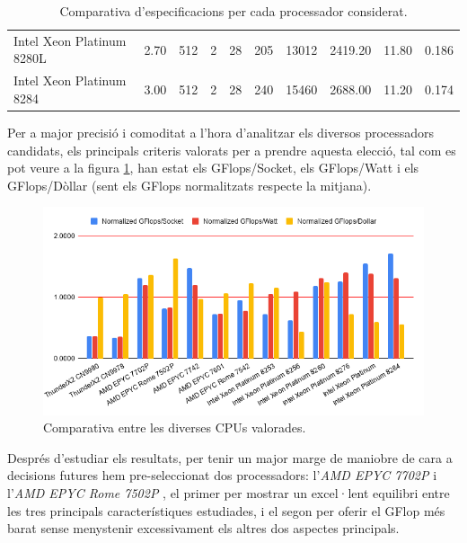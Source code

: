 \begin{table}[H]
\begin{adjustwidth}{-1.0in}{-1.0in}
\begin{center}
{\begin{tabular}{l||c|c|c|c|c|c|c|c|c}
Intel Xeon Platinum 8280L & 2.70       & 512                                                       & 2                                                        & 28    & 205   & 13012      & 2419.20       & 11.80       & 0.186         \\
\rowcolor[HTML]{EFEFEF} 
Intel Xeon Platinum 8284  & 3.00       & 512                                                       & 2                                                        & 28    & 240   & 15460      & 2688.00       & 11.20       & 0.174         \\ \hline 
\end{tabular}
}
    \caption{Comparativa d'especificacions per cada processador considerat.}
    \label{tab:cpu_cmp}
    \end{center}
    \end{adjustwidth}
\end{table}

Per a major precisió i comoditat a l'hora d'analitzar els diversos processadors candidats, els principals criteris valorats per a prendre aquesta elecció, tal com es pot veure a la figura \ref{chartCPUs}, han estat els GFlops/Socket, els GFlops/Watt i els GFlops/Dòllar (sent els GFlops normalitzats respecte la mitjana). 

\begin{figure}[H]
    \centering
    \includegraphics[width=\textwidth]{img/chartCPU}
    \caption{Comparativa entre les diverses CPUs valorades.}
    \label{chartCPUs}
\end{figure}

Després d'estudiar els resultats, per tenir un major marge de maniobre de cara a decisions futures hem pre-seleccionat dos processadors: l'\textit{AMD EPYC 7702P} \cite{cpu_amd_7702_buy} i l'\textit{AMD EPYC Rome 7502P} \cite{cpu_amd_7502_buy}, el primer per mostrar un excel·lent equilibri entre les tres principals característiques estudiades, i el segon per oferir el GFlop més barat sense menystenir excessivament els altres dos aspectes principals.
